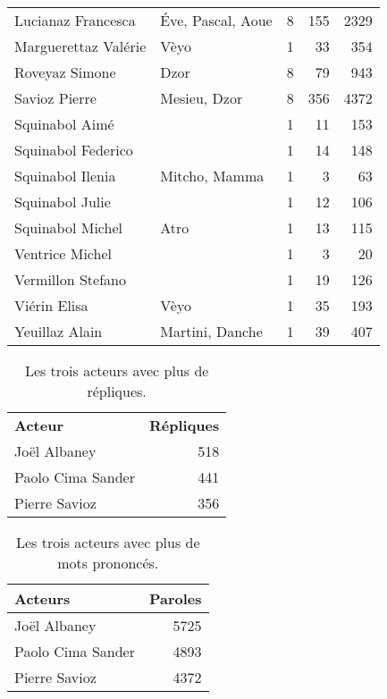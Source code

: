\begin{longtable}{llrrr}
Lucianaz Francesca &Éve, Pascal, Aoue & 8 & 155 & 2329\\
Marguerettaz Valérie &Vèyo & 1 & 33 & 354\\
Roveyaz Simone &Dzor & 8 & 79 & 943\\
Savioz Pierre &Mesieu, Dzor & 8 & 356 & 4372\\
Squinabol Aimé & & 1 & 11 & 153\\
Squinabol Federico & & 1 & 14 & 148\\
Squinabol Ilenia &Mitcho, Mamma & 1 & 3 & 63\\
Squinabol Julie & & 1 & 12 & 106\\
Squinabol Michel &Atro & 1 & 13 & 115\\
Ventrice Michel & & 1 & 3 & 20\\
Vermillon Stefano & & 1 & 19 & 126\\
Viérin Elisa &Vèyo & 1 & 35 & 193\\
Yeuillaz Alain &Martini, Danche & 1 & 39 & 407\\
\bottomrule
\end{longtable}
\begin{table}[]
\centering
\caption{Les trois acteurs avec plus de répliques.}
\begin{tabular}{l|r}
\toprule
\multicolumn{1}{l}{\textbf{Acteur}} & \textbf{Répliques} \\

\multicolumn{1}{l}{Joël Albaney} &518\\
\multicolumn{1}{l}{Paolo Cima Sander} &441\\
\multicolumn{1}{l}{Pierre Savioz} &356\\
\bottomrule
\end{tabular}%
\end{table}
\newpage
\begin{table}[]
\centering
\caption{Les trois acteurs avec plus de mots prononcés.}
\begin{tabular}{l|r}
    \toprule
\multicolumn{1}{l}{\textbf{Acteurs}} & \textbf{Paroles} \\
    \midrule
\multicolumn{1}{l}{Joël Albaney} &5725\\
\multicolumn{1}{l}{Paolo Cima Sander} &4893\\
\multicolumn{1}{l}{Pierre Savioz} &4372\\
\bottomrule
\end{tabular}%
\end{table}
